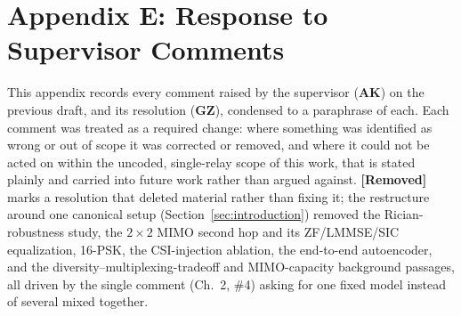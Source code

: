 \section{Appendix E: Response to Supervisor Comments}\label{sec:appendix-response-to-comments}

This appendix records every comment raised by the supervisor (\textbf{AK}) on the previous draft, and its resolution (\textbf{GZ}), condensed to a paraphrase of each. Each comment was treated as a required change: where something was identified as wrong or out of scope it was corrected or removed, and where it could not be acted on within the uncoded, single-relay scope of this work, that is stated plainly and carried into future work rather than argued against. \textbf{[Removed]} marks a resolution that deleted material rather than fixing it; the restructure around one canonical setup (Section~\ref{sec:introduction}) removed the Rician-robustness study, the $2\times2$ MIMO second hop and its ZF/LMMSE/SIC equalization, 16-PSK, the CSI-injection ablation, the end-to-end autoencoder, and the diversity--multiplexing-tradeoff and MIMO-capacity background passages, all driven by the single comment (Ch.~2, \#4) asking for one fixed model instead of several mixed together.

